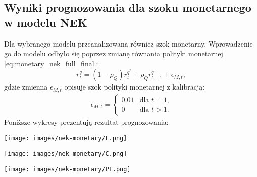 \subsection{Wyniki prognozowania dla szoku monetarnego w modelu NEK}
\label{sec:results_nek_mon}

Dla wybranego modelu przeanalizowana również szok monetarny. Wprowadzenie go do modelu odbyło się poprzez zmianę równania polityki monetarnej \eqref{eq:monetary_nek_full_final}:
\begin{equation}
    r^q_t = (1-\rho_Q)r^{q^*}_t + \rho_Q r^q_{t-1} + \epsilon_{M,t},
\end{equation}
gdzie zmienna $\epsilon_{M,t}$ opisuje szok polityki monetarnej z kalibracją:
\begin{gather}
        \epsilon_{M,t} =
        \begin{cases}
            0.01 & \text{dla $t = 1$,} \\
            0 & \text{dla $t > 1$.}
        \end{cases}
\end{gather}
Poniższe wykresy prezentują rezultat prognozowania:
\begin{center}
    \begin{minipage}{.3\textwidth}
      \centering
      \captionsetup{type=figure}
      \texttt{[image: images/nek-monetary/L.png]}
      \label{fig:nek-monetary:L}
    \end{minipage}%
    \begin{minipage}{.3\textwidth}
      \centering
      \captionsetup{type=figure}
      \texttt{[image: images/nek-monetary/C.png]}
      \label{fig:nek-monetary:C}
    \end{minipage}
    \begin{minipage}{.3\textwidth}
      \centering
      \captionsetup{type=figure}
      \texttt{[image: images/nek-monetary/PI.png]}
      \label{fig:nek-monetary:PI}
    \end{minipage}
\end{center}

